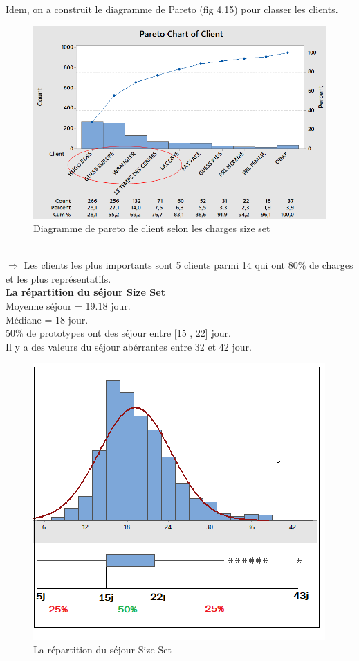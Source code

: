 \documentclass[12pt, a4paper]{thesis}
\begin{document}
Idem, on a construit le diagramme de Pareto (fig 4.15) pour classer les clients.\\
\begin{figure}[!h]
\begin{center}
\includegraphics[scale=0.7]{parsize.png}
\caption{Diagramme de pareto de client selon les charges size set}
\end{center}
\end{figure}\\
$\Longrightarrow$ Les clients les plus importants sont 5 clients parmi 14 qui ont 80\% de charges et les plus représentatifs.\\


\textbf{La répartition du séjour Size Set}\\
Moyenne séjour = 19.18 jour.\\
Médiane = 18 jour. \\
50\% de prototypes ont des séjour entre [15 , 22] jour.\\
Il y a des valeurs du séjour abérrantes entre 32 et 42 jour.\\ 


\begin{figure}[!h]
\begin{center}
\includegraphics[scale=0.7]{reparsize.png}
\caption{La répartition du séjour Size Set}
\end{center}
\end{figure}
\end{document}
